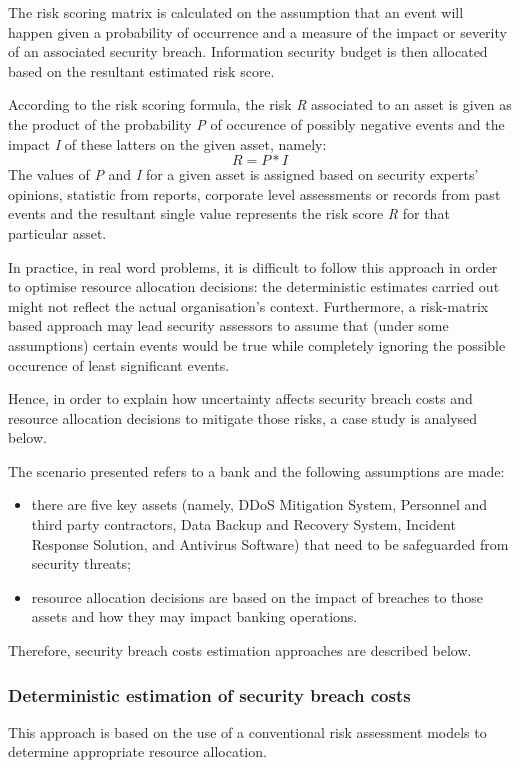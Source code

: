 The risk scoring matrix is calculated on the assumption that an event will happen given a probability of occurrence and a measure of the impact or severity of an associated security breach.
Information security budget is then allocated based on the resultant estimated risk score.

According to the risk scoring formula, the risk \textit{R} associated to an asset is given as the product of the probability \textit{P} of occurence of possibly negative events and the impact \textit{I} of these latters on the given asset, namely: \begin{equation} R = P * I \end{equation}
The values of \textit{P} and \textit{I} for a given asset is assigned based on security experts' opinions, statistic from reports, corporate level assessments or records from past events and the resultant single value represents the risk score \textit{R} for that particular asset.

In practice, in real word problems, it is difficult to follow this approach in order to optimise resource allocation decisions: the deterministic estimates carried out might not reflect the actual organisation's context.
Furthermore, a risk-matrix based approach may lead security assessors to assume that (under some assumptions) certain events would be true while completely ignoring the possible occurence of least significant events.

Hence, in order to explain how uncertainty affects security breach costs and resource allocation decisions to mitigate those risks, a case study is analysed below.

The scenario presented \parencite{Fagade} refers to a bank and the following assumptions are made:
\begin{itemize}
    \item there are five key assets (namely, DDoS Mitigation System, Personnel and third party contractors, Data Backup and Recovery System, Incident Response Solution, and Antivirus Software) that need to be safeguarded from security threats;
    \item resource allocation decisions are based on the impact of breaches to those assets and how they may impact banking operations.
\end{itemize}

Therefore, security breach costs estimation approaches are described below.

\subsubsection{Deterministic estimation of security breach costs}
This approach is based on the use of a conventional risk assessment models to determine appropriate resource allocation.

